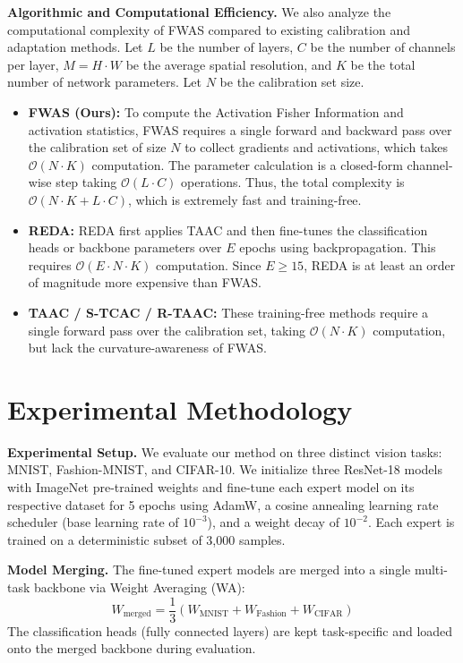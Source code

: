 \documentclass{article}
\theoremstyle{plain}
\theoremstyle{definition}
\theoremstyle{remark}
\begin{document}
\textbf{Algorithmic and Computational Efficiency.} 
We also analyze the computational complexity of FWAS compared to existing calibration and adaptation methods. Let $L$ be the number of layers, $C$ be the number of channels per layer, $M = H \cdot W$ be the average spatial resolution, and $K$ be the total number of network parameters. Let $N$ be the calibration set size.
\begin{itemize}
    \item \textbf{FWAS (Ours):} To compute the Activation Fisher Information and activation statistics, FWAS requires a single forward and backward pass over the calibration set of size $N$ to collect gradients and activations, which takes $\mathcal{O}(N \cdot K)$ computation. The parameter calculation is a closed-form channel-wise step taking $\mathcal{O}(L \cdot C)$ operations. Thus, the total complexity is $\mathcal{O}(N \cdot K + L \cdot C)$, which is extremely fast and training-free.
    \item \textbf{REDA:} REDA first applies TAAC and then fine-tunes the classification heads or backbone parameters over $E$ epochs using backpropagation. This requires $\mathcal{O}(E \cdot N \cdot K)$ computation. Since $E \ge 15$, REDA is at least an order of magnitude more expensive than FWAS.
    \item \textbf{TAAC / S-TCAC / R-TAAC:} These training-free methods require a single forward pass over the calibration set, taking $\mathcal{O}(N \cdot K)$ computation, but lack the curvature-awareness of FWAS.
\end{itemize}

\section{Experimental Methodology}
\label{sec:experiments}

\textbf{Experimental Setup.} We evaluate our method on three distinct vision tasks: MNIST, Fashion-MNIST, and CIFAR-10. We initialize three ResNet-18 models with ImageNet pre-trained weights and fine-tune each expert model on its respective dataset for 5 epochs using AdamW, a cosine annealing learning rate scheduler (base learning rate of $10^{-3}$), and a weight decay of $10^{-2}$. Each expert is trained on a deterministic subset of 3,000 samples.

\textbf{Model Merging.} The fine-tuned expert models are merged into a single multi-task backbone via Weight Averaging (WA):
\begin{equation}
    W_{\text{merged}} = \frac{1}{3}(W_{\text{MNIST}} + W_{\text{Fashion}} + W_{\text{CIFAR}})
\end{equation}
The classification heads (fully connected layers) are kept task-specific and loaded onto the merged backbone during evaluation.
\end{document}
